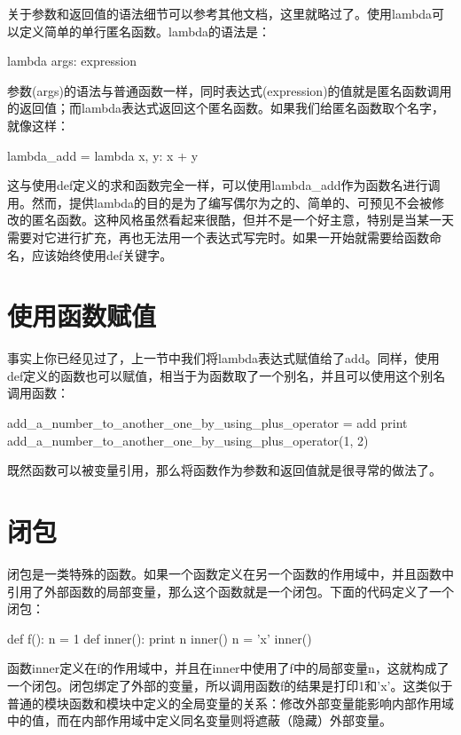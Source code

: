 \documentclass[12pt,a4paper]{report}
\begin{document}
关于参数和返回值的语法细节可以参考其他文档，这里就略过了。使用lambda可以定义简单的单行匿名函数。lambda的语法是： 
\begin{python}[moreemph={[4]42},caption={},label=ex1]
lambda args: expression
\end{python}

参数(args)的语法与普通函数一样，同时表达式(expression)的值就是匿名函数调用的返回值；而lambda表达式返回这个匿名函数。如果我们给匿名函数取个名字，就像这样： 
\begin{python}[moreemph={[4]42},caption={},label=ex1]
lambda_add = lambda x, y: x + y
\end{python}

这与使用def定义的求和函数完全一样，可以使用lambda\_add作为函数名进行调用。然而，提供lambda的目的是为了编写偶尔为之的、简单的、可预见不会被修改的匿名函数。这种风格虽然看起来很酷，但并不是一个好主意，特别是当某一天需要对它进行扩充，再也无法用一个表达式写完时。如果一开始就需要给函数命名，应该始终使用def关键字。 
\section{使用函数赋值} 

事实上你已经见过了，上一节中我们将lambda表达式赋值给了add。同样，使用def定义的函数也可以赋值，相当于为函数取了一个别名，并且可以使用这个别名调用函数：
\begin{python}[moreemph={[4]42},caption={},label=ex1]
add_a_number_to_another_one_by_using_plus_operator = add
print add_a_number_to_another_one_by_using_plus_operator(1, 2)
\end{python}

既然函数可以被变量引用，那么将函数作为参数和返回值就是很寻常的做法了。

\section{闭包}
闭包是一类特殊的函数。如果一个函数定义在另一个函数的作用域中，并且函数中引用了外部函数的局部变量，那么这个函数就是一个闭包。下面的代码定义了一个闭包： 
\begin{python}[moreemph={[4]42},caption={},label=ex1]
def f():
    n = 1
    def inner():
        print n
    inner()
    n = 'x'
    inner()
\end{python}

函数inner定义在f的作用域中，并且在inner中使用了f中的局部变量n，这就构成了一个闭包。闭包绑定了外部的变量，所以调用函数f的结果是打印1和'x'。这类似于普通的模块函数和模块中定义的全局变量的关系：修改外部变量能影响内部作用域中的值，而在内部作用域中定义同名变量则将遮蔽（隐藏）外部变量。
\end{document}
